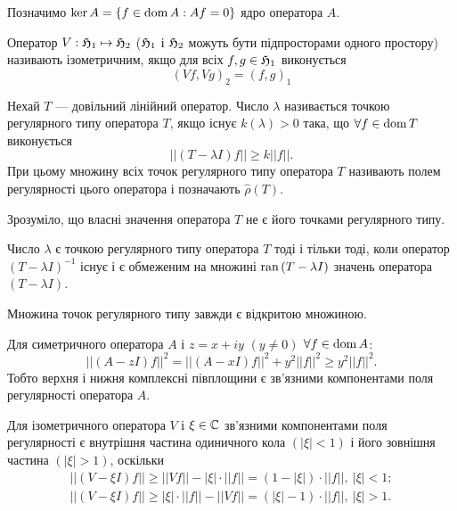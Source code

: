 Позначимо $\ker{A} = \{ f\in\operatorname{dom}{A}:Af=0 \}$ ядро оператора $A$.
 
\begin{definition}
	Оператор $V:\mathfrak{H}_1 \mapsto \mathfrak{H}_2$ ($\mathfrak{H}_1$ і $\mathfrak{H}_2$ можуть бути підпросторами одного простору) називають ізометричним, якщо для всіх $f,g\in \mathfrak{H}_1$ виконується
	\begin{equation*}
		(Vf,Vg)_2 = (f,g)_1
	\end{equation*}
\end{definition}

\begin{definition}
	Нехай $T$ --- довільний лінійний оператор. Число $\lambda$ називається точкою регулярного типу оператора $T$, якщо існує $k(\lambda)>0$ така, що $\forall f\in \operatorname{dom}{T}$ виконується
	\begin{equation*}
		||(T-\lambda I)f||\ge k||f||.
	\end{equation*}
	При цьому множину всіх точок регулярного типу оператора $T$ називають полем регулярності цього оператора і позначають $\widehat\rho(T)$. 
\end{definition}

Зрозуміло, що власні значення оператора $T$ не є його точками регулярного типу.

\begin{remark*}
	Число $\lambda$ є точкою регулярного типу оператора $T$ тоді і тільки тоді, коли оператор $(T-\lambda I)^{-1}$ існує і є обмеженим на множині $\operatorname{ran}{(T-\lambda I)}$ значень оператора $(T-\lambda I)$.
\end{remark*}

\begin{remark*}
	Множина точок регулярного типу завжди є відкритою множиною.
\end{remark*}

Для симетричного оператора $A$ і $z=x+iy$ $(y \ne 0)$ $\forall f\in \operatorname{dom}{A}$:
\begin{equation*}
	||(A-zI)f||^2 = ||(A-xI)f||^2 + y^2||f||^2 \ge y^2||f||^2.
\end{equation*}
Тобто верхня і нижня комплексні півплощини є зв'язними компонентами поля регулярності оператора $A$.

Для ізометричного оператора $V$ і $\xi \in \mathbb{C}$ зв'язними компонентами поля регулярності є внутрішня частина одиничного кола $(|\xi|<1)$ і його зовнішня частина $(|\xi|>1)$, оскільки
\begin{gather*}
	||(V-\xi I)f|| \ge ||Vf|| - |\xi|\cdot ||f|| = (1-|\xi|)\cdot ||f||,\ |\xi|<1; \\
	||(V-\xi I)f|| \ge |\xi|\cdot ||f|| - ||Vf|| = (|\xi|-1)\cdot ||f||,\ |\xi|>1.
\end{gather*}

